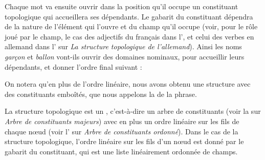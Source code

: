 Chaque mot va ensuite ouvrir dans la position qu’il occupe un constituant topologique qui accueillera ses dépendants. Le gabarit du constituant dépendra de la nature de l’élément qui l’ouvre et du champ qu’il occupe (voir, pour le rôle joué par le champ, le cas des adjectifs du français dans l’, et celui des verbes en allemand dans l’ sur \textit{La structure topologique de l’allemand}). Ainsi les noms \textit{garçon} et \textit{ballon} vont-ils ouvrir des domaines nominaux, pour accueillir leurs dépendants, et donner l’ordre final suivant :

\ea{}
\z

On notera qu’en plus de l’ordre linéaire, nous avons obtenu une structure avec des constituants emboîtés, que nous appelons la  de la phrase.

La structure topologique est un , c’est-à-dire un arbre de constituants (voir la  sur \textit{Arbre de constituants majeurs}) avec en plus un ordre linéaire sur les fils de chaque nœud (voir l’ sur \textit{Arbre de constituants ordonné}). Dans le cas de la structure topologique, l’ordre linéaire sur les fils d’un nœud est donné par le gabarit du constituant, qui est une liste linéairement ordonnée de champs.

